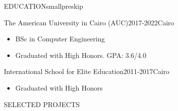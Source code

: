 \documentclass{resume}
\begin{document}
\begin{minipage}[t]{0.54\textwidth}

	\begin{rsection}{\MakeUppercase{education}}{smallpreskip}

		\begin{rcontent}{The American University in Cairo (AUC)}{2017-2022}{}{Cairo}
			\begin{itemize}
				\item BSc in Computer Engineering
				\item Graduated with High Honors. GPA: 3.6/4.0
			\end{itemize}
		\end{rcontent}
		\divider
		\begin{rcontent}{International School for Elite Education}{2011-2017}{}{Cairo}
			\begin{itemize}
				\item Graduated with High Honors
			\end{itemize}
		\end{rcontent}

	\end{rsection}

	\begin{rsection}{\MakeUppercase{selected projects}}{}


\end{rsection}
\end{minipage}
\end{document}
